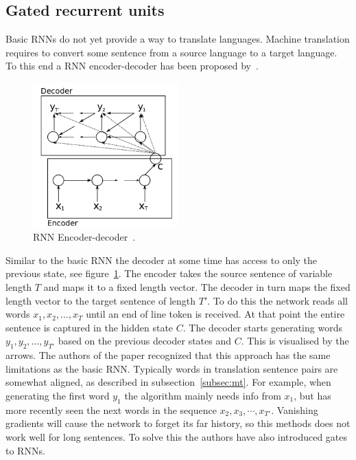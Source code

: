 \subsection{Gated recurrent units}
\label{subsec:gru}
Basic RNNs do not yet provide a way to translate languages.
Machine translation requires to convert some sentence from a source language to a target language.
To this end a RNN encoder-decoder has been proposed by~\citet{cho2014learning}.

\begin{figure}[htbp]
    \begin{center}
        \includegraphics[width=0.5\textwidth]{figures/encoder_decoder.png}
    \end{center}
    \caption{RNN Encoder-decoder~\cite[Figure 1]{cho2014learning}.}
    \label{fig:encoder_decoder}
\end{figure}

Similar to the basic RNN the decoder at some time has access to only the previous state, see figure~\ref{fig:encoder_decoder}.
The encoder takes the source sentence of variable length $T$ and maps it to a fixed length vector.
The decoder in turn maps the fixed length vector to the target sentence of length $T'$.
To do this the network reads all words $x_1, x_2, \ldots, x_T$ until an end of line token is received.
At that point the entire sentence is captured in the hidden state $C$.
The decoder starts generating words $y_1, y_2, \ldots, y_{T'}$ based on the previous decoder states and $C$.
This is visualised by the arrows.
The authors of the paper recognized that this approach has the same limitations as the basic RNN.
Typically words in translation sentence pairs are somewhat aligned, as described in subsection~\ref{subsec:mt}.
For example, when generating the first word $y_1$ the algorithm mainly needs info from $x_1$, but has more recently seen the next words in the sequence $x_2, x_3, \cdots, x_{T'}$.
Vanishing gradients will cause the network to forget its far history, so this methods does not work well for long sentences.
To solve this the authors have also introduced gates to RNNs.

